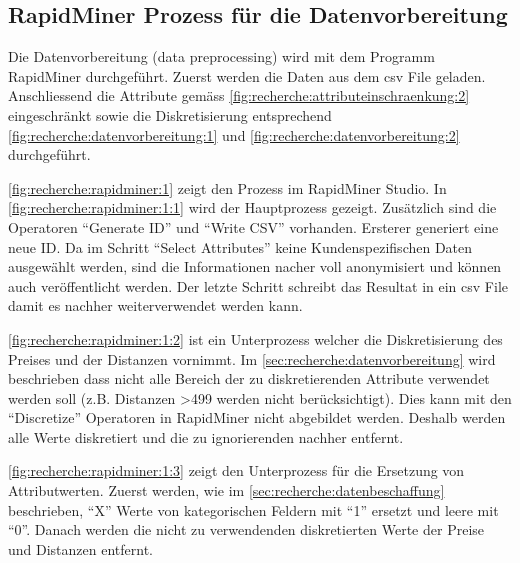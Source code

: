 
\subsection{RapidMiner Prozess für die Datenvorbereitung}
\label{sec:konzept:rapidminer}

Die Datenvorbereitung (data preprocessing) wird mit dem Programm RapidMiner durchgeführt.
Zuerst werden die Daten aus dem \gls{csv} File geladen. Anschliessend die Attribute gemäss \cref{fig:recherche:attributeinschraenkung:2} eingeschränkt sowie die Diskretisierung entsprechend \cref{fig:recherche:datenvorbereitung:1} und \ref{fig:recherche:datenvorbereitung:2} durchgeführt.

\cref{fig:recherche:rapidminer:1} zeigt den Prozess im RapidMiner Studio. In \ref{fig:recherche:rapidminer:1:1} wird der Hauptprozess gezeigt. Zusätzlich sind die Operatoren "`Generate ID"' und "`Write CSV"' vorhanden. Ersterer generiert eine neue ID. Da im Schritt "`Select Attributes"' keine Kundenspezifischen Daten ausgewählt werden, sind die Informationen nacher voll anonymisiert und können auch veröffentlicht werden. Der letzte Schritt schreibt das Resultat in ein \gls{csv} File damit es nachher weiterverwendet werden kann.

\cref{fig:recherche:rapidminer:1:2} ist ein Unterprozess welcher die Diskretisierung des Preises und der Distanzen vornimmt. Im \cref{sec:recherche:datenvorbereitung} wird beschrieben dass nicht alle Bereich der zu diskretierenden Attribute verwendet werden soll (z.B. Distanzen >499 werden nicht berücksichtigt). Dies kann mit den "`Discretize"' Operatoren in RapidMiner nicht abgebildet werden. Deshalb werden alle Werte diskretiert und die zu ignorierenden nachher entfernt.

\cref{fig:recherche:rapidminer:1:3} zeigt den Unterprozess für die Ersetzung von Attributwerten. Zuerst werden, wie im \cref{sec:recherche:datenbeschaffung} beschrieben, "`X"' Werte von kategorischen Feldern mit "`1"' ersetzt und leere mit "`0"'. Danach werden die nicht zu verwendenden diskretierten Werte der Preise und Distanzen entfernt.

